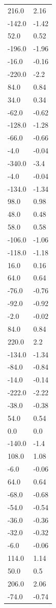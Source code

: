 \begin{longtable}{ll}
216.0 & 2.16 \\
-142.0 & -1.42 \\
52.0 & 0.52 \\
-196.0 & -1.96 \\
-16.0 & -0.16 \\
-220.0 & -2.2 \\
84.0 & 0.84 \\
34.0 & 0.34 \\
-62.0 & -0.62 \\
-128.0 & -1.28 \\
-66.0 & -0.66 \\
-4.0 & -0.04 \\
-340.0 & -3.4 \\
-4.0 & -0.04 \\
-134.0 & -1.34 \\
98.0 & 0.98 \\
48.0 & 0.48 \\
58.0 & 0.58 \\
-106.0 & -1.06 \\
-118.0 & -1.18 \\
16.0 & 0.16 \\
64.0 & 0.64 \\
-76.0 & -0.76 \\
-92.0 & -0.92 \\
-2.0 & -0.02 \\
84.0 & 0.84 \\
220.0 & 2.2 \\
-134.0 & -1.34 \\
-84.0 & -0.84 \\
-14.0 & -0.14 \\
-222.0 & -2.22 \\
-38.0 & -0.38 \\
54.0 & 0.54 \\
0.0 & 0.0 \\
-140.0 & -1.4 \\
108.0 & 1.08 \\
-6.0 & -0.06 \\
64.0 & 0.64 \\
-68.0 & -0.68 \\
-54.0 & -0.54 \\
-36.0 & -0.36 \\
-32.0 & -0.32 \\
-6.0 & -0.06 \\
114.0 & 1.14 \\
50.0 & 0.5 \\
206.0 & 2.06 \\
-74.0 & -0.74 \\

\end{longtable}

